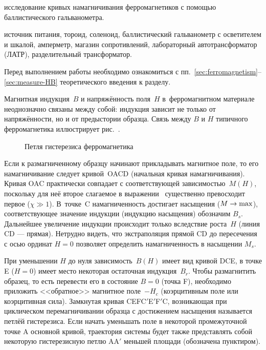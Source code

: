 
\begin{lab:aim}
	исследование кривых намагничивания ферромагнетиков с помощью баллистического
гальванометра.
\end{lab:aim}

\begin{lab:equipment}
	источник питания, тороид, соленоид, баллистический гальванометр с
осветителем и шкалой,
	амперметр, магазин сопротивлений, лабораторный автотрансформатор (ЛАТР),
разделительный трансформатор.
\end{lab:equipment}


Перед выполнением работы необходимо ознакомиться с
пп.~\ref{sec:ferromagnetism}--\ref{sec:measure-HB} теоретического введения к
разделу.

Магнитная индукция~${B}$ и напряжённость поля~${H}$
в~ферромагнитном материале неоднозначно связаны между
собой: индукция зависит не только от напряжённости, но и от предыстории образца.
Связь между $B$ и $H$ типичного ферромагнетика иллюстрирует
рис.~.

\begin{figure}[h]
    \centering
    \caption{Петля гистерезиса ферромагнетика}
\end{figure}

Если к размагниченному образцу начинают прикладывать магнитное поле,
то его намагничивание следует кривой~OACD (начальная кривая намагничивания).
Кривая OAC практически совпадает с соответствующей зависимостью~$M(H)$,
поскольку для неё второе слагаемое в выражении~
существенно превосходит первое ($\chi\gg1$). В~точке~C намагниченность
достигает насыщения ($M\to \rm max$), соответствующее значение
индукции (индукцию насыщения) обозначим $B_s$.
Дальнейшее увеличение индукции происходит только вследствие
роста~$H$ (линия CD --- прямая). Нетрудно видеть, что экстраполяция прямой CD до пересечения
с осью ординат $H=0$ позволяет определить намагниченность в насыщении
$M_s$.

При уменьшении $H$ до нуля зависимость~$B(H)$ имеет вид
кривой DCE, в точке E ($H=0$) имеет место некоторая остаточная индукция~$B_r$.
Чтобы размагнитить образец, то есть перевести
его в состояние $B=0$ (точка F), необходимо приложить <<обратное>> магнитное поле~$-H_c$
(коэрцитивным поле или коэрцитивная сила).
Замкнутая кривая CEFC$'$E$'$F$'$C, возникающая при циклическом перемагничивании
образца с достижением насыщения
называется  петлёй гистерезиса. Если начать уменьшать поле
в некоторой промежуточной точке A основной кривой, траектория
системы будет также представлять собой некоторую гистерезисную петлю AA$'$
меньшей площади (обозначена пунктиром).

